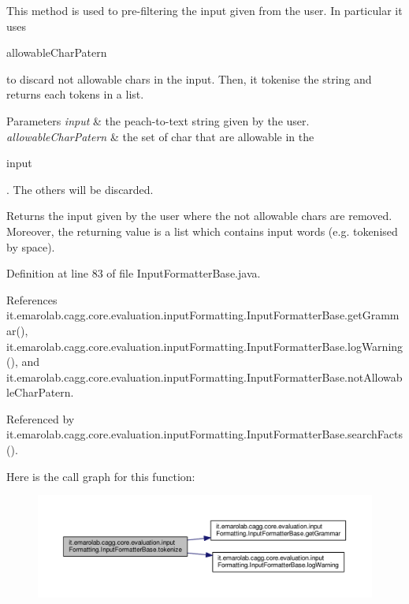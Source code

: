 This method is used to pre-\/filtering the input given from the user. In particular it uses
\begin{DoxyCode}
allowableCharPatern 
\end{DoxyCode}
 to discard not allowable chars in the input. Then, it tokenise the string and returns each tokens in a list. 
\begin{DoxyParams}{Parameters}
{\em input} & the peach-\/to-\/text string given by the user. \\
\hline
{\em allowable\-Char\-Patern} & the set of char that are allowable in the
\begin{DoxyCode}
input 
\end{DoxyCode}
 . The others will be discarded. \\
\hline
\end{DoxyParams}
\begin{DoxyReturn}{Returns}
the input given by the user where the not allowable chars are removed. Moreover, the returning value is a list which contains input words (e.\-g. tokenised by space). 
\end{DoxyReturn}


Definition at line 83 of file Input\-Formatter\-Base.\-java.



References it.\-emarolab.\-cagg.\-core.\-evaluation.\-input\-Formatting.\-Input\-Formatter\-Base.\-get\-Grammar(), it.\-emarolab.\-cagg.\-core.\-evaluation.\-input\-Formatting.\-Input\-Formatter\-Base.\-log\-Warning(), and it.\-emarolab.\-cagg.\-core.\-evaluation.\-input\-Formatting.\-Input\-Formatter\-Base.\-not\-Allowable\-Char\-Patern.



Referenced by it.\-emarolab.\-cagg.\-core.\-evaluation.\-input\-Formatting.\-Input\-Formatter\-Base.\-search\-Facts().



Here is the call graph for this function\-:\nopagebreak
\begin{figure}[H]
\begin{center}
\leavevmode
\includegraphics[width=350pt]{classit_1_1emarolab_1_1cagg_1_1core_1_1evaluation_1_1inputFormatting_1_1InputFormatterBase_adcf0ea9d9e41cf238b4e18a7ad8a81a2_cgraph}
\end{center}
\end{figure}





